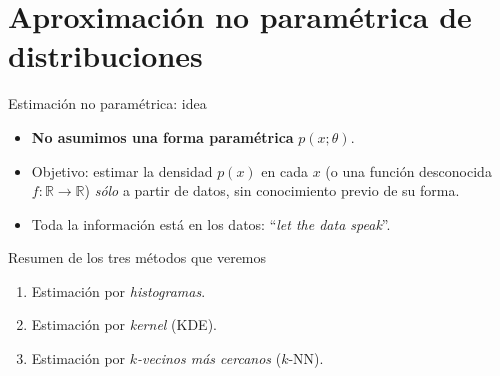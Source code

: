\documentclass[10pt,aspectratio=169]{beamer}
\newcommand{\R}{\mathbb{R}}
\newcommand{\0}{\mathbf{0}}
\newcommand{\1}{\mathbf{1}}
\begin{document}
\section{Aproximación no paramétrica de distribuciones}
\begin{frame}{Estimación no paramétrica: idea}
  \begin{itemize}
    \item \textbf{No asumimos una forma paramétrica} $p(x;\theta)$.
    \item Objetivo: estimar la densidad $p(x)$ en cada $x$ (o una
          función desconocida $f:\R\to\R$) \emph{sólo} a partir de
          datos, sin conocimiento previo de su forma.
    \item Toda la información está en los datos: ``\emph{let the data speak}''.
  \end{itemize}
  \vspace{0.2em}
  \begin{block}{Resumen de los tres métodos que veremos}
    \begin{enumerate}
      \item Estimación por \emph{histogramas}.
      \item Estimación por \emph{kernel} (KDE).
      \item Estimación por \emph{$k$-vecinos más cercanos} ($k$-NN).
    \end{enumerate}
  \end{block}
\end{frame}
\end{document}
